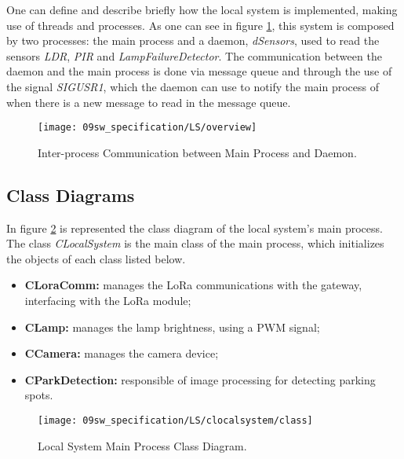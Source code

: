 One can define and describe briefly how the local system is implemented, making use of threads and processes. As one can see in figure \ref{fig:task_overview}, this system is composed by two processes: the main process and a daemon, \textit{dSensors}, used to read the sensors \textit{LDR}, \textit{PIR} and \textit{LampFailureDetector}. The communication between the daemon and the main process is done via message queue and through the use of the signal \textit{SIGUSR1}, which the daemon can use to notify the main process of when there is a new message to read in the message queue.

\begin{figure}[H]
	\centering
	\texttt{[image: 09sw\_specification/LS/overview]}
	\caption{Inter-process Communication between Main Process and Daemon.}
	\label{fig:task_overview}
\end{figure}

\subsection{Class Diagrams}
In figure \ref{fig:clocalsystem} is represented the class diagram of the local system's main process. The class \textit{CLocalSystem} is the main class of the main process, which initializes the objects of each class listed below.

\begin{itemize}
	\item \textbf{CLoraComm:} manages the LoRa communications with the gateway, interfacing with the LoRa module;
	\item \textbf{CLamp:} manages the lamp brightness, using a PWM signal;	
	\item \textbf{CCamera:} manages the camera device;
	\item \textbf{CParkDetection:} responsible of image processing for detecting parking spots.
\end{itemize}

\begin{figure}[H]
	\centering
	\texttt{[image: 09sw\_specification/LS/clocalsystem/class]}
	\caption{Local System Main Process Class Diagram.}
	\label{fig:clocalsystem}
\end{figure}

